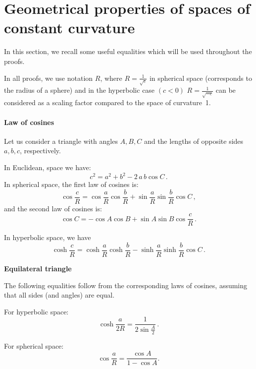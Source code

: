\documentclass{article} %
\begin{document}




\appendix

\section{Geometrical properties of spaces of constant curvature}

In this section, we recall some useful equalities which will be used throughout the proofs.

In all proofs, we use notation $R$, where $R = \frac{1}{\sqrt{c}}$ in spherical space (corresponds to the radius of a sphere) and in the hyperbolic case $(c < 0)$ $R = \frac{1}{\sqrt{-c}}$ can be considered as a scaling factor compared to the space of curvature~1.

\paragraph{Law of cosines}

Let us consider a triangle with angles $A, B, C$ and the lengths of opposite sides $a, b, c$, respectively.

In Euclidean, space we have:
\[
c^2 = a^2 + b^2 - 2 \, a\, b \cos C\,.
\]
In spherical space, the first law of cosines is:
\[
\cos \frac{c}{R} =\cos \frac{a}{R} \cos \frac{b}{R} + \sin \frac{a}{R}\sin \frac{b}{R}\cos C \,,
\]
and the second law of cosines is:
\[
\cos C=-\cos A\cos B+\sin A\sin B\cos \frac{c}{R}\,.
\]

In hyperbolic space, we have 
\[
\cosh {\frac {c}{R}}= \cosh {\frac {a}{R}}\cosh {\frac {b}{R}}-\sinh {\frac {a}{R}}\sinh {\frac {b}{R}}\cos C \,.
\]

\textbf{Equilateral triangle}

The following equalities follow from the corresponding laws of cosines, assuming that all sides (and angles) are equal.

For hyperbolic space:
\begin{equation}\label{eq:hyp_eq}
\cosh\frac{a}{2R} = \frac{1}{2\sin \frac{A}{2}}\,.
\end{equation}

For spherical space:
\begin{equation}\label{eq:sph_eq}
\cos{\frac{a}{R}} = \frac{\cos A}{1 - \cos A}.
\end{equation}
\end{document}
